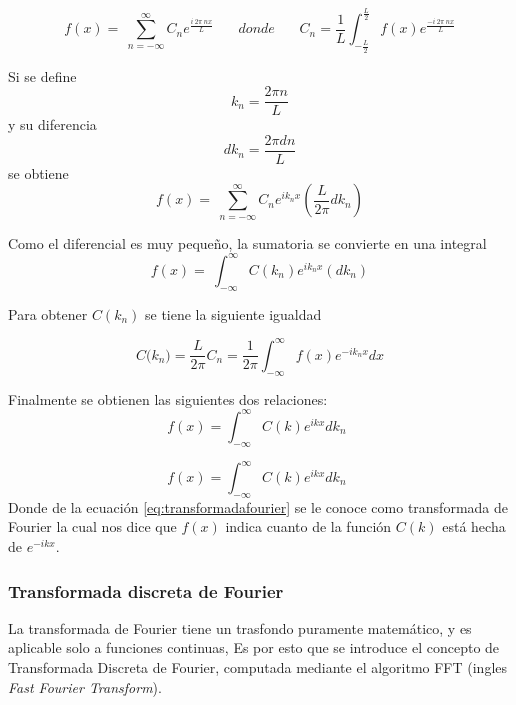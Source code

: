 			\begin{equation}
				f\left(x\right)=\ \sum_{n=-\infty{}}^{\infty{}}C_ne^{\frac{i\ 2\pi{}\ nx}{L}}\ \
				\ \ \ \ \ \ donde\ \ \ \ \ \ \ \
					C_n=\frac{1}{L}\int_{-\frac{L}{2}}^{\frac{L}{2}}f(x)e^{\frac{-i\ 2\pi{}\ nx}{L}}
			\end{equation}
			
          	Si se define $$k_n= \frac{2\pi n}{L}$$ y su diferencia $$dk_n = \frac{2\pi dn}{L}$$ se obtiene
			\begin{equation}
				f\left(x\right)=\ \sum_{n=-\infty{}}^{\infty{}}C_ne^{ik_nx}\left(\frac{L}{2\pi{}}{dk}_n\right)
			\end{equation}
			
			Como el diferencial es muy pequeño, la sumatoria se convierte en una integral
			\begin{equation}
				f\left(x\right)=\ \int_{-\infty{}}^{\infty{}}C(k_n)e^{ik_nx}\left({dk}_n\right)
			\end{equation}
			
			Para obtener $C(k_n )$  se tiene la siguiente igualdad
			
			\begin{equation}
				\left. C(k_n\right.)=\frac{L}{2\pi{}}C_n=\frac{1}{2\pi{}}\int_{-\infty{}}^{\infty{}}f(x)e^{-ik_nx}dx
			\end{equation}
			
			Finalmente se obtienen las siguientes dos relaciones:
			\begin{equation}
				f\left(x\right)=\int_{-\infty{}}^{\infty{}}C\left(k\right)e^{ikx}{dk}_n\ \
			\end{equation}
		    
		    \begin{equation}
		    f\left(x\right)=\int_{-\infty{}}^{\infty{}}C\left(k\right)e^{ikx}{dk}_n\ \
		    \label{eq:transformadafourier}
		    \end{equation}
			Donde de la ecuación \ref{eq:transformadafourier} se le conoce como transformada de Fourier la cual nos dice que $f(x)$ indica cuanto de la función $C(k)$ está hecha de $e^{-ikx}$. 
		\subsubsection{Transformada discreta de Fourier}
			La transformada de Fourier tiene un trasfondo puramente matemático, y es aplicable solo a funciones continuas, Es por esto que se introduce el concepto de Transformada Discreta de Fourier, computada mediante el algoritmo FFT (ingles \textit{Fast Fourier Transform}).
			
